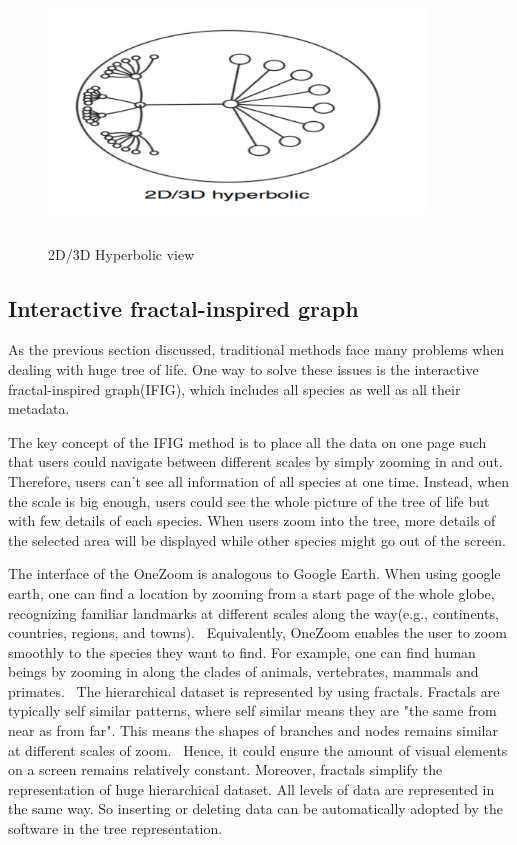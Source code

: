 \documentclass[MSc]{icldt}
\begin{document}
\begin{itemize}
  \begin{figure}[H]
  \centering
  \includegraphics [width=10cm,height=6.8cm]{Hyperbolic}
  \caption{2D/3D Hyperbolic view}
  \label{fig:Hyperbolic}
\end{figure}

\end{itemize}


\subsection{Interactive fractal-inspired graph}

As the previous section discussed, traditional methods face many problems when dealing with huge tree of life. One way to solve these issues is the interactive fractal-inspired graph(IFIG), which includes all species as well as all their metadata. 

The key concept of the IFIG method is to place all the data on one page such that users could navigate between different scales by simply zooming in and out.~\cite{oneZoomWebsite} Therefore, users can't see all information of all species at one time. Instead, when the scale is big enough, users could see the whole picture of the tree of life but with few details of each species. When users zoom into the tree, more details of the selected area will be displayed while other species might go out of the screen.

The interface of the OneZoom is analogous to Google Earth. When using google earth, one can find a location by zooming from a start page of the whole globe, recognizing familiar landmarks at different scales along the way(e.g., continents, countries, regions, and towns).~\cite{oneZoom} Equivalently, OneZoom enables the user to zoom smoothly to the species they want to find. For example, one can find human beings by zooming in along the clades of animals, vertebrates, mammals and primates.~\cite{oneZoom} The hierarchical dataset is represented by using fractals. Fractals are typically self similar patterns, where self similar means they are "the same from near as from far". This means the shapes of branches and nodes remains similar at different scales of zoom.~\cite{fractalBook} Hence, it could ensure the amount of visual elements on a screen remains relatively constant. Moreover, fractals simplify the representation of huge hierarchical dataset. All levels of data are represented in the same way. So inserting or deleting data can be automatically adopted by the software in the tree representation.
\end{document}
